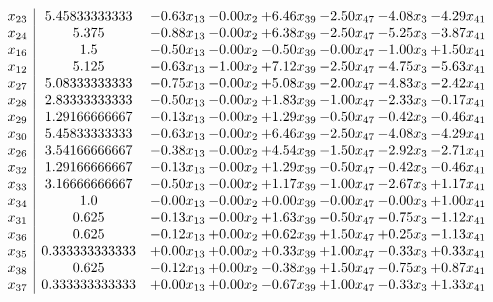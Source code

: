 \documentclass[8pt]{article}
\begin{document}
\[\begin{array}{c| c c@{\hskip 2pt} c@{\hskip 2pt} c@{\hskip 2pt} c@{\hskip 2pt} c@{\hskip 2pt} c@{\hskip 2pt} }
 x_{23}   &  5.45833333333 & -0.63 x_{13} & -0.00 x_{2} & +  6.46 x_{39} & -2.50 x_{47} & -4.08 x_{3} & -4.29 x_{41}\\
 x_{24}   &  5.375 & -0.88 x_{13} & -0.00 x_{2} & +  6.38 x_{39} & -2.50 x_{47} & -5.25 x_{3} & -3.87 x_{41}\\
 x_{16}   &  1.5 & -0.50 x_{13} & -0.00 x_{2} & -0.50 x_{39} & -0.00 x_{47} & -1.00 x_{3} & +  1.50 x_{41}\\
 x_{12}   &  5.125 & -0.63 x_{13} & -1.00 x_{2} & +  7.12 x_{39} & -2.50 x_{47} & -4.75 x_{3} & -5.63 x_{41}\\
 x_{27}   &  5.08333333333 & -0.75 x_{13} & -0.00 x_{2} & +  5.08 x_{39} & -2.00 x_{47} & -4.83 x_{3} & -2.42 x_{41}\\
 x_{28}   &  2.83333333333 & -0.50 x_{13} & -0.00 x_{2} & +  1.83 x_{39} & -1.00 x_{47} & -2.33 x_{3} & -0.17 x_{41}\\
 x_{29}   &  1.29166666667 & -0.13 x_{13} & -0.00 x_{2} & +  1.29 x_{39} & -0.50 x_{47} & -0.42 x_{3} & -0.46 x_{41}\\
 x_{30}   &  5.45833333333 & -0.63 x_{13} & -0.00 x_{2} & +  6.46 x_{39} & -2.50 x_{47} & -4.08 x_{3} & -4.29 x_{41}\\
 x_{26}   &  3.54166666667 & -0.38 x_{13} & -0.00 x_{2} & +  4.54 x_{39} & -1.50 x_{47} & -2.92 x_{3} & -2.71 x_{41}\\
 x_{32}   &  1.29166666667 & -0.13 x_{13} & -0.00 x_{2} & +  1.29 x_{39} & -0.50 x_{47} & -0.42 x_{3} & -0.46 x_{41}\\
 x_{33}   &  3.16666666667 & -0.50 x_{13} & -0.00 x_{2} & +  1.17 x_{39} & -1.00 x_{47} & -2.67 x_{3} & +  1.17 x_{41}\\
 x_{34}   &  1.0 & -0.00 x_{13} & -0.00 x_{2} & +  0.00 x_{39} & -0.00 x_{47} & -0.00 x_{3} & +  1.00 x_{41}\\
 x_{31}   &  0.625 & -0.13 x_{13} & -0.00 x_{2} & +  1.63 x_{39} & -0.50 x_{47} & -0.75 x_{3} & -1.12 x_{41}\\
 x_{36}   &  0.625 & -0.12 x_{13} & +  0.00 x_{2} & +  0.62 x_{39} & +  1.50 x_{47} & +  0.25 x_{3} & -1.13 x_{41}\\
 x_{35}   &  0.333333333333 & +  0.00 x_{13} & +  0.00 x_{2} & +  0.33 x_{39} & +  1.00 x_{47} & -0.33 x_{3} & +  0.33 x_{41}\\
 x_{38}   &  0.625 & -0.12 x_{13} & +  0.00 x_{2} & -0.38 x_{39} & +  1.50 x_{47} & -0.75 x_{3} & +  0.87 x_{41}\\
 x_{37}   &  0.333333333333 & +  0.00 x_{13} & +  0.00 x_{2} & -0.67 x_{39} & +  1.00 x_{47} & -0.33 x_{3} & +  1.33 x_{41}\\

\end{array}\]
\end{document}
